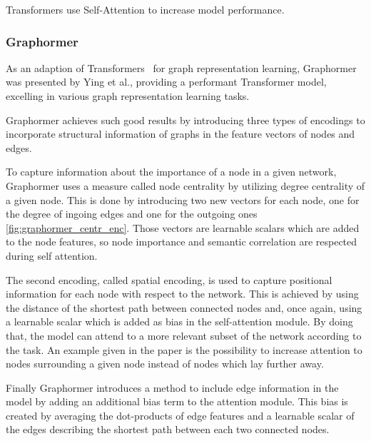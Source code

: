Transformers use Self-Attention to increase model performance.
\subsubsection{Graphormer}
As an adaption of Transformers~\cite{vaswani2017attention} for graph representation learning, Graphormer~\cite{2021graphormer} was presented by Ying et al., providing a performant Transformer model, excelling in various graph representation learning tasks.

Graphormer achieves such good results by introducing three types of encodings to incorporate structural information of graphs in the feature vectors of nodes and edges.

To capture information about the importance of a node in a given network, Graphormer uses a measure called node centrality by utilizing degree centrality of a given node. This is done by introducing two new vectors for each node, one for the degree of ingoing edges and one for the outgoing ones \autoref{fig:graphormer_centr_enc}. Those vectors are learnable scalars which are added to the node features, so node importance and semantic correlation are respected during self attention. 

The second encoding, called spatial encoding, is used to capture positional information for each node with respect to the network. This is achieved by using the distance of the shortest path between connected nodes and, once again, using a learnable scalar which is added as bias in the self-attention module. By doing that, the model can attend to a more relevant subset of the network according to the task. An example given in the paper is the possibility to increase attention to nodes surrounding a given node instead of nodes which lay further away.

Finally Graphormer introduces a method to include edge information in the model by adding an additional bias term to the attention module. This bias is created by averaging the dot-products of edge features and a learnable scalar of the edges describing the shortest path between each two connected nodes. 

